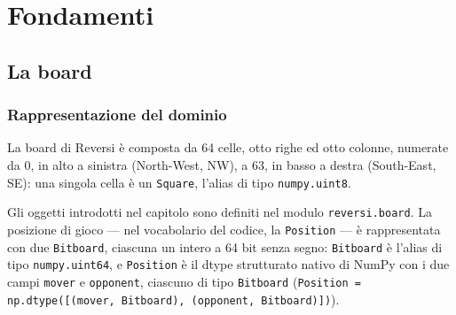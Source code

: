 %
%
%
%
%
%
%
%
%
%
\part{Fondamenti}

\chapter{La board}

\section{Rappresentazione del dominio}

La board di Reversi è composta da 64 celle, otto righe ed otto colonne, numerate da 0, in alto a sinistra (North-West, NW),
a 63, in basso a destra (South-East, SE): una singola cella è un \texttt{Square}, l'alias di tipo \texttt{numpy.uint8}.

Gli oggetti introdotti nel capitolo sono definiti nel modulo \texttt{reversi.board}. La posizione di gioco — nel
vocabolario del codice, la \texttt{Position} — è rappresentata con due \texttt{Bitboard}, ciascuna un intero a 64 bit
senza segno: \texttt{Bitboard} è l'alias di tipo \texttt{numpy.uint64}, e
\texttt{Position} è il dtype strutturato nativo di NumPy con i due campi \texttt{mover} e \texttt{opponent}, ciascuno
di tipo \texttt{Bitboard}
(\texttt{Position = np.dtype([(\textquotesingle mover\textquotesingle, Bitboard), (\textquotesingle opponent\textquotesingle, Bitboard)])}).

